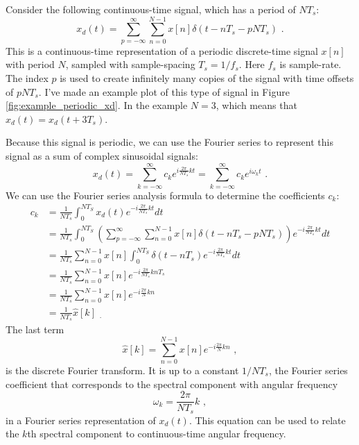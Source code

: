 Consider the following continuous-time signal, which has a
period of $N T_s$:
\begin{equation}
  x_d(t) = \sum_{p=-\infty}^{\infty} \sum_{n=0}^{N-1} x[n] \delta(t - n T_s - p N T_s ) \,\,.
  \label{eq:dtft_time_per0}
\end{equation}
This is a continuous-time representation of a periodic discrete-time
signal $x[n]$ with period $N$, sampled with sample-spacing $T_s =
  1/f_s$. Here $f_s$ is sample-rate. The index $p$ is used to create
infinitely many copies of the signal with time offsets of
$pNT_s$. I've made an example plot of this type of signal in
Figure \ref{fig:example_periodic_xd}. In the example $N=3$, which
means that $x_d(t)=x_d(t+3T_s)$.

Because this signal is periodic, we can use the Fourier series to
represent this signal as a sum of complex sinusoidal signals:
\begin{equation}
  x_d(t) = \sum_{k=-\infty}^{\infty} c_k e^{i\frac{2\pi}{NT_s}kt}  = \sum_{k=-\infty}^{\infty} c_k e^{i \omega_k t} \,\,.
\end{equation}
We can use the Fourier series analysis formula to determine the coefficients $c_k$:
\begin{align}
  c_k & = \frac{1}{N T_s} \int_{0}^{N T_S} x_d(t) e^{-i\frac{2\pi}{N T_s}kt}dt                                                                                     \\
      & = \frac{1}{N T_s} \int_{0}^{N T_S} \left(\sum_{p=-\infty}^{\infty} \sum_{n=0}^{N-1} x[n] \delta(t - n T_s - p N T_s ) \right) e^{-i\frac{2\pi}{N T_s}kt}dt \\
      & = \frac{1}{N T_s} \sum_{n=0}^{N-1} x[n] \int_{0}^{N T_S} \delta(t - n T_s)  e^{-i\frac{2\pi}{N T_s}kt}dt                                                   \\
      & =  \frac{1}{N T_s} \sum_{n=0}^{N-1} x[n]  e^{-i\frac{2\pi}{N T_s}k n T_s}                                                                                  \\
      & =  \frac{1}{N T_s} \sum_{n=0}^{N-1} x[n] e^{-i\frac{2\pi}{N}kn  }                                                                                          \\
      & =  \frac{1}{N T_s} \hat{x}[k] \,\, _.
\end{align}
The last term
\begin{equation}
  \hat{x}[k] = \sum_{n=0}^{N-1} x[n] e^{-i\frac{2\pi}{N}kn  } \,\,,
  \label{eq:dtft_fs_0}
\end{equation}
is the discrete Fourier transform. It is up to a constant $1/NT_s$, the
Fourier series coefficient that corresponds to the spectral component
with angular frequency
\begin{equation}
  \boxed{
    \omega_k = \frac{2\pi}{N T_s}k
  } \,\,,
\end{equation}
in a Fourier series representation of $x_d(t)$. This equation can
be used to relate the $k$th spectral component to continuous-time
angular frequency.


